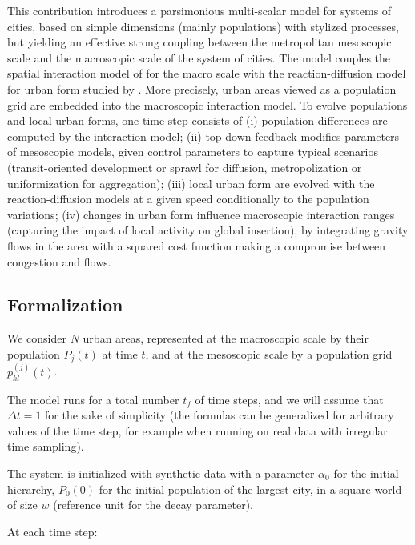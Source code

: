 \documentclass[11pt]{article}
\begin{document}
This contribution introduces a parsimonious multi-scalar model for systems of cities, based on simple dimensions (mainly populations) with stylized processes, but yielding an effective strong coupling between the metropolitan mesoscopic scale and the macroscopic scale of the system of cities. The model couples the spatial interaction model of \cite{raimbault2018indirect} for the macro scale with the reaction-diffusion model for urban form studied by \cite{raimbault2018calibration}. More precisely, urban areas viewed as a population grid are embedded into the macroscopic interaction model. To evolve populations and local urban forms, one time step consists of (i) population differences are computed by the interaction model; (ii) top-down feedback modifies parameters of mesoscopic models, given control parameters to capture typical scenarios (transit-oriented development or sprawl for diffusion, metropolization or uniformization for aggregation); (iii) local urban form are evolved with the reaction-diffusion models at a given speed conditionally to the population variations; (iv) changes in urban form influence macroscopic interaction ranges (capturing the impact of local activity on global insertion), by integrating gravity flows in the area with a squared cost function making a compromise between congestion and flows.


\subsection{Formalization}


We consider $N$ urban areas, represented at the macroscopic scale by their population $P_j(t)$ at time $t$, and at the mesoscopic scale by a population grid $p_{kl}^{(j)}(t)$.

The model runs for a total number $t_f$ of time steps, and we will assume that $\Delta t = 1$ for the sake of simplicity (the formulas can be generalized for arbitrary values of the time step, for example when running on real data with irregular time sampling).

The system is initialized with synthetic data with a parameter $\alpha_0$ for the initial hierarchy, $P_0 (0)$ for the initial population of the largest city, in a square world of size $w$ (reference unit for the decay parameter).

At each time step:
\end{document}
